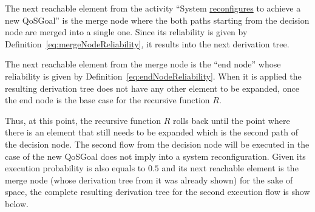 The next reachable element from the activity ``System \underline{reconfigures} to achieve a
new QoSGoal'' is the merge node where the both paths starting from the decision
node are merged into a single one. Since its reliability is given by
Definition~\ref{eq:mergeNodeReliability}, it results into the
next derivation tree. 


\begin{center}
\end{center}


The next reachable element from the merge node is the ``end node'' whose
reliability is given by Definition~\ref{eq:endNodeReliability}. When it is
applied the resulting derivation tree does not have any other
element to be expanded, once the end node is the base case for the recursive
function $R$. 


\begin{center}
\end{center}


Thus, at this point, the recursive function $R$ rolls back until the point where
there is an element that still needs to be expanded which is the second path of
the decision node. The second flow from the decision node will be executed in
the case of the new QoSGoal does not imply into a system reconfiguration. Given
its execution probability is also equals to $0.5$ and its next reachable element
is the merge node (whose derivation tree from it was already shown) for the sake
of space, the complete resulting derivation tree for the second execution flow
is show below. 


